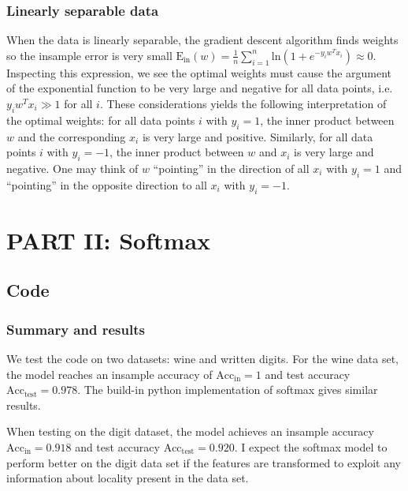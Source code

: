 \documentclass{article}
\begin{document}
	\subsubsection*{Linearly separable data}
	When the data is linearly separable, the gradient descent algorithm finds weights so the insample error is very small $\mathrm{E_{in}}(w) = \frac{1}{n}\sum_{i=1}^n \mathrm{ln}(1 + e^{-y_i w^T x_i}) \approx 0$. Inspecting this expression, we see the optimal weights must cause the argument of the exponential function to be very large and negative for all data points, i.e. $y_i w^T x_i \gg 1$ for all $i$. These considerations yields the following interpretation of the optimal weights: for all data points $i$ with $y_i = 1$, the inner product between $w$ and the corresponding $x_i$ is very large and positive. Similarly, for all data points $i$ with $y_i = -1$, the inner product between $w$ and $x_i$ is very large and negative. One may think of $w$ ``pointing'' in the direction of all $x_i$ with $y_i=1$ and ``pointing'' in the opposite direction to all $x_i$ with $y_i = -1$.
\section*{PART II: Softmax}
\subsection*{Code}
\subsubsection*{Summary and results}
We test the code on two datasets: wine and written digits.
For the wine data set, the model reaches an insample accuracy of $\mathrm{Acc_{in}} = 1$ and test accuracy $\mathrm{Acc_{test}} = 0.978$. The build-in python implementation of softmax gives similar results.

When testing on the digit dataset, the model achieves an insample accuracy $\mathrm{Acc_{in}} = 0.918$ and test accuracy $\mathrm{Acc_{test}} = 0.920$.
I expect the softmax model to perform better on the digit data set if the features are transformed to exploit any information about locality present in the data set.
\end{document}
